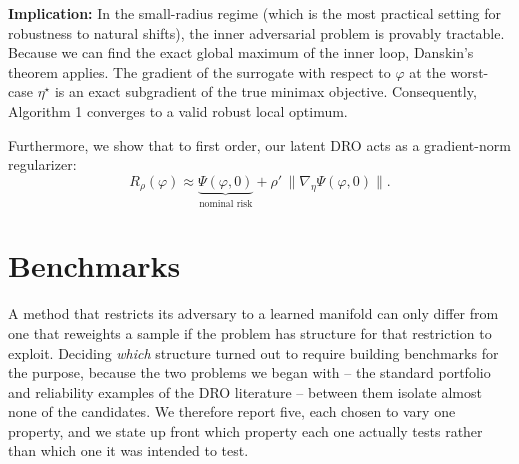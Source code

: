 \documentclass[11pt]{article}
\newcommand{\design}{\varphi}
\begin{document}
\textbf{Implication:} In the small-radius regime (which is the most practical setting for robustness to natural shifts), the inner adversarial problem is provably tractable. Because we can find the exact global maximum of the inner loop, Danskin's theorem \citep{danskin1967} applies. The gradient of the surrogate with respect to $\design$ at the worst-case $\eta^\star$ is an exact subgradient of the true minimax objective. Consequently, Algorithm 1 converges to a valid robust local optimum.

Furthermore, we show that to first order, our latent DRO acts as a gradient-norm regularizer:
\begin{equation}
  R_\rho(\design) \approx \underbrace{\Psi(\design,0)}_{\text{nominal risk}} + \rho'\,\|\nabla_\eta \Psi(\design,0)\|.
\end{equation}

\section{Benchmarks}
\label{sec:benchmarks}
A method that restricts its adversary to a learned manifold can only differ from one that
reweights a sample if the problem has structure for that restriction to exploit. Deciding
\emph{which} structure turned out to require building benchmarks for the purpose, because
the two problems we began with -- the standard portfolio and reliability examples of the
DRO literature -- between them isolate almost none of the candidates. We therefore report
five, each chosen to vary one property, and we state up front which property each one
actually tests rather than which one it was intended to test.
\end{document}
